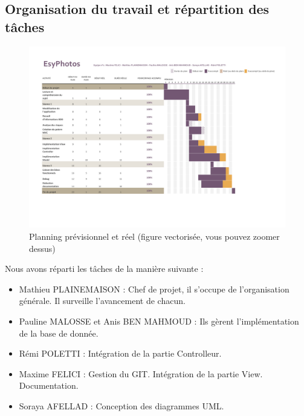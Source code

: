\documentclass{article}
\begin{document}
\begin{flushleft}
\newpage
\section{Organisation du travail et répartition des tâches}

\begin{figure}[!h]
  \begin{center}
    \includegraphics[scale=0.5]{fig4} %
    \caption{Planning prévisionnel et réel (figure vectorisée, vous pouvez zoomer dessus)}
  \end{center}
\end{figure}

Nous avons réparti les tâches de la manière suivante : \\

\begin{itemize}
  \item Mathieu PLAINEMAISON : Chef de projet, il s'occupe de l'organisation
  générale. Il surveille l'avancement de chacun.
  \item Pauline MALOSSE et Anis BEN MAHMOUD : Ils gèrent l'implémentation
  de la base de donnée.
  \item Rémi POLETTI : Intégration de la partie Controlleur.
  \item Maxime FELICI : Gestion du GIT. Intégration de la partie View.
  Documentation.
  \item Soraya AFELLAD : Conception des diagrammes UML.
\end{itemize}

\newpage

\end{flushleft}
\end{document}
